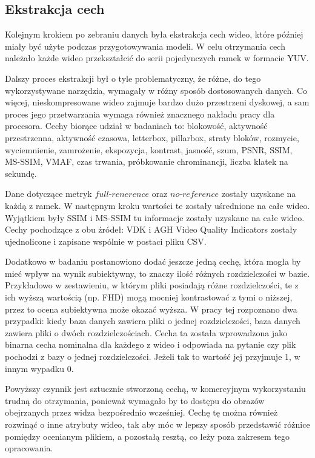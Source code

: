 \subsection{Ekstrakcja cech}
Kolejnym krokiem po zebraniu danych była ekstrakcja cech wideo, które później miały być użyte podczas przygotowywania modeli. W celu otrzymania cech należało każde wideo przekształcić do serii pojedynczych ramek w formacie YUV. 

Dalszy proces ekstrakcji był o tyle problematyczny, że różne, do tego wykorzystywane narzędzia, wymagały w różny sposób dostosowanych danych. Co więcej, nieskompresowane wideo zajmuje bardzo dużo przestrzeni dyskowej, a sam proces jego przetwarzania  wymaga również znacznego nakładu pracy dla procesora. Cechy biorące udział w badaniach to: blokowość, aktywność przestrzenna, aktywność czasowa, letterbox, pillarbox, straty bloków, rozmycie, wyciemnienie, zamrożenie, ekspozycja, kontrast, jasność, szum, PSNR, SSIM, MS-SSIM, VMAF, czas trwania, próbkowanie chrominancji, liczba klatek na sekundę.\par

Dane dotyczące metryk $full$-$renerence$ oraz $no$-$reference$ zostały uzyskane na każdą z ramek. W następnym kroku wartości te zostały uśrednione na całe wideo. Wyjątkiem były SSIM i MS\--SSIM tu informacje zostały uzyskane na całe wideo. Cechy pochodzące z obu źródeł: VDK i AGH Video Quality Indicators zostały ujednolicone i zapisane wspólnie w postaci pliku CSV.\par

Dodatkowo w badaniu postanowiono dodać jeszcze jedną cechę, która mogła by mieć wpływ na wynik subiektywny, to znaczy ilość różnych rozdzielczości w bazie. Przykładowo w zestawieniu, w którym pliki posiadają różne rozdzielczości, te z ich wyższą wartością (np. FHD) mogą mocniej kontrastować z tymi o niższej, przez to ocena subiektywna może okazać wyższa. W pracy tej rozpoznano dwa przypadki: kiedy baza danych zawiera pliki o jednej rozdzielczości, baza danych zawiera pliki o dwóch rozdzielczościach. Cecha ta została wprowadzona jako binarna cecha nominalna dla każdego z wideo i odpowiada na pytanie czy plik pochodzi z bazy o jednej rozdzielczości. Jeżeli tak to wartość jej przyjmuje 1, w innym wypadku 0.  \par

Powyższy czynnik jest sztucznie stworzoną cechą, w komercyjnym wykorzystaniu trudną do otrzymania, ponieważ wymagało by to dostępu do obrazów obejrzanych przez widza bezpośrednio wcześniej. Cechę tę można również rozwinąć o inne atrybuty wideo, tak aby móc w lepszy sposób przedstawić różnice pomiędzy ocenianym plikiem, a pozostałą resztą, co leży poza zakresem tego opracowania.\par

